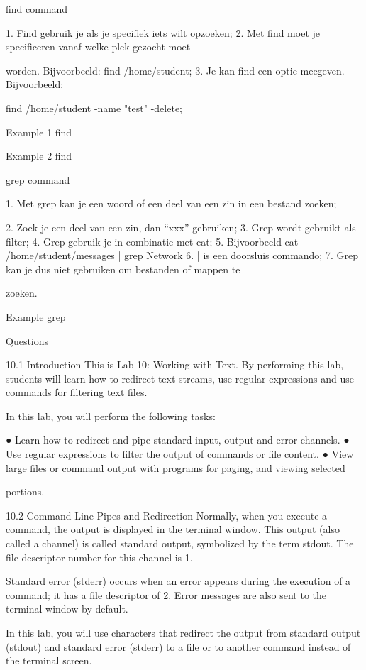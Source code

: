 find command

1. Find gebruik je als je specifiek iets wilt opzoeken; 
2. Met find moet je specificeren vanaf welke plek gezocht moet 

worden. Bijvoorbeeld: find /home/student;
3. Je kan find een optie meegeven. Bijvoorbeeld:

find /home/student -name "test" -delete;



Example 1 find



Example 2 find



grep command

1. Met grep kan je een woord of een deel van een zin in een bestand 
zoeken;

2. Zoek je een deel van een zin, dan “xxx” gebruiken;
3. Grep wordt gebruikt als filter;
4. Grep gebruik je in combinatie met cat;
5. Bijvoorbeeld cat /home/student/messages | grep Network
6. | is een doorsluis commando;
7. Grep kan je dus niet gebruiken om bestanden of mappen te 

zoeken.



Example grep



Questions


10.1 Introduction
This is Lab 10: Working with Text. By performing this lab, students will learn how to redirect text
streams, use regular expressions and use commands for filtering text files.

In this lab, you will perform the following tasks:

● Learn how to redirect and pipe standard input, output and error channels.
● Use regular expressions to filter the output of commands or file content.
● View large files or command output with programs for paging, and viewing selected

portions.

10.2 Command Line Pipes and Redirection
Normally, when you execute a command, the output is displayed in the terminal window. This
output (also called a channel) is called standard output, symbolized by the term stdout. The file
descriptor number for this channel is 1.

Standard error (stderr) occurs when an error appears during the execution of a command; it
has a file descriptor of 2. Error messages are also sent to the terminal window by default.

In this lab, you will use characters that redirect the output from standard output (stdout) and
standard error (stderr) to a file or to another command instead of the terminal screen.

